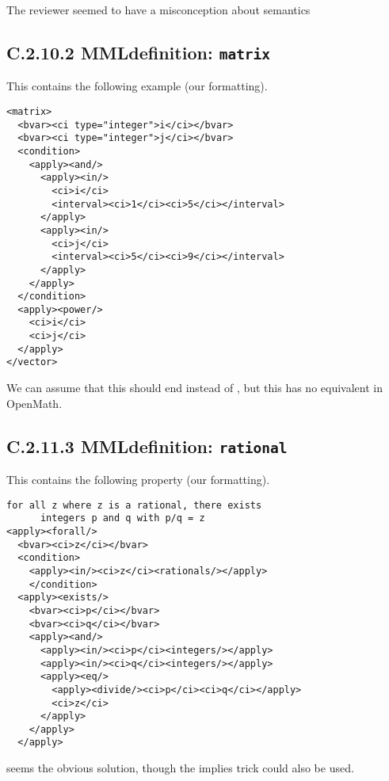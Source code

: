 \documentclass{llncs}
\begin{document}
\begin{newpart}{The reviewer seemed to have a misconception about semantics}
\subsection{C.2.10.2 MMLdefinition: {\tt matrix}}\label{C2102}
This contains the following example (our formatting).
\begin{lstlisting}[language=MathML2]
<matrix>
  <bvar><ci type="integer">i</ci></bvar>
  <bvar><ci type="integer">j</ci></bvar>
  <condition>
    <apply><and/>
      <apply><in/>
        <ci>i</ci>
        <interval><ci>1</ci><ci>5</ci></interval>
      </apply>
      <apply><in/>
        <ci>j</ci>
        <interval><ci>5</ci><ci>9</ci></interval>
      </apply>
    </apply>
  </condition>
  <apply><power/>
    <ci>i</ci>
    <ci>j</ci>
  </apply>
</vector>
\end{lstlisting}
We can assume that this should end {} instead of
{}, but this has no equivalent in OpenMath.
\subsection{C.2.11.3 MMLdefinition: {\tt rational}}\label{C2113}
This contains the following property (our formatting).
\begin{lstlisting}[language=MathML2]
    for all z where z is a rational, there exists 
      integers p and q with p/q = z
<apply><forall/>
  <bvar><ci>z</ci></bvar>
  <condition>
    <apply><in/><ci>z</ci><rationals/></apply>
    </condition>
  <apply><exists/>
    <bvar><ci>p</ci></bvar>
    <bvar><ci>q</ci></bvar>
    <apply><and/>
      <apply><in/><ci>p</ci><integers/></apply>
      <apply><in/><ci>q</ci><integers/></apply>
      <apply><eq/>
        <apply><divide/><ci>p</ci><ci>q</ci></apply>
        <ci>z</ci>
      </apply>
    </apply>
  </apply> 
\end{lstlisting}
{} seems the obvious solution, though the implies trick
could also be used.

\end{newpart}
\end{document}
